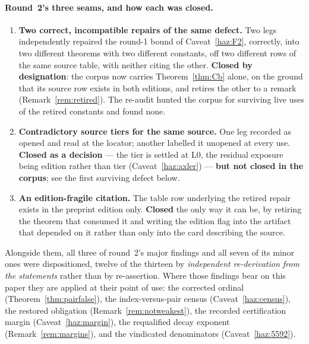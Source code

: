 \documentclass[11pt,a4paper]{article}
\theoremstyle{plain}
\theoremstyle{definition}
\theoremstyle{remark}
\begin{document}
\paragraph{Round~2's three seams, and how each was closed.}
\begin{enumerate}
\item \textbf{Two correct, incompatible repairs of the same defect.} Two legs independently
  repaired the round-1 bound of Caveat~\ref{haz:F2}, correctly, into two different theorems
  with two different constants, off two different rows of the same source table, with neither
  citing the other. \textbf{Closed by designation}: the corpus now carries
  Theorem~\ref{thm:Cb} alone, on the ground that its source row exists in both editions, and
  retires the other to a remark (Remark~\ref{rem:retired}). The re-audit hunted the corpus for
  surviving live uses of the retired constants and found none.
\item \textbf{Contradictory source tiers for the same source.} One leg recorded
  \cite{axler2014newbounds} as opened and read at the locator; another labelled it unopened at
  every use. \textbf{Closed as a decision} --- the tier is settled at L0, the residual
  exposure being edition rather than tier (Caveat~\ref{haz:axler}) --- \textbf{but not closed
  in the corpus}; see the first surviving defect below.
\item \textbf{An edition-fragile citation.} The table row underlying the retired repair exists
  in the preprint edition only. \textbf{Closed} the only way it can be, by retiring the
  theorem that consumed it and writing the edition flag into the artifact that depended on it
  rather than only into the card describing the source.
\end{enumerate}
Alongside them, all three of round~2's major findings and all seven of its minor ones were
dispositioned, twelve of the thirteen by \emph{independent re-derivation from the statements}
rather than by re-assertion. Where those findings bear on this paper they are applied at their
point of use: the corrected ordinal (Theorem~\ref{thm:pairfalse}), the index-versus-pair
census (Caveat~\ref{haz:census}), the restored obligation (Remark~\ref{rem:notweakest}), the
recorded certification margin (Caveat~\ref{haz:margin}), the requalified decay exponent
(Remark~\ref{rem:margins}), and the vindicated denominators (Caveat~\ref{haz:5592}).
\end{document}
